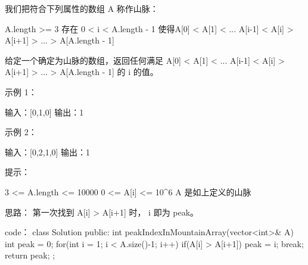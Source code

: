我们把符合下列属性的数组 A 称作山脉：

    A.length >= 3
    存在 0 < i < A.length - 1 使得A[0] < A[1] < ... A[i-1] < A[i] > A[i+1] > ... > A[A.length - 1]

给定一个确定为山脉的数组，返回任何满足 A[0] < A[1] < ... A[i-1] < A[i] > A[i+1] > ... > A[A.length - 1] 的 i 的值。

 

示例 1：

输入：[0,1,0]
输出：1

示例 2：

输入：[0,2,1,0]
输出：1

 

提示：

    3 <= A.length <= 10000
    0 <= A[i] <= 10^6
    A 是如上定义的山脉







































思路：
第一次找到 A[i] > A[i+1] 时， i 即为 peak。


































code：
class Solution {
public:
    int peakIndexInMountainArray(vector<int>& A) {
        int peak = 0;
        for(int i = 1; i < A.size()-1; i++)
        {
            if(A[i] > A[i+1])
            {
                peak = i; break;
            }
        }
        return peak;
    }
};